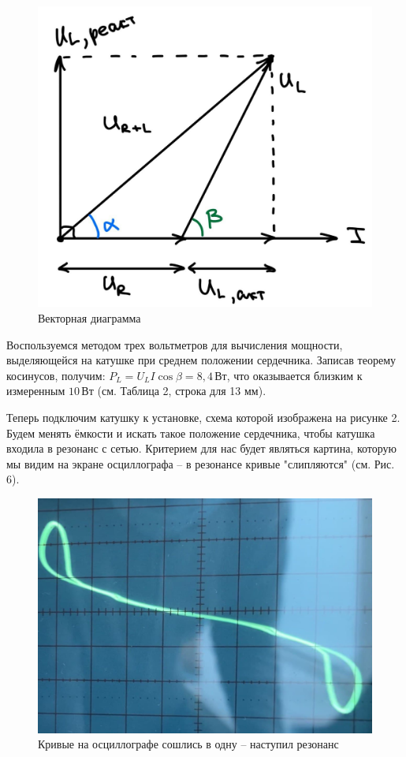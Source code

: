 \documentclass[a4paper, fontsize = 14pt]{article}
\begin{document}
\begin{figure}[hbt]
	\centering
	\includegraphics[scale=0.2]{lab48ris5.png}
	\caption{Векторная диаграмма}
\end{figure}

Воспользуемся методом трех вольтметров для вычисления мощности, выделяющейся на катушке при среднем положении сердечника. Записав теорему косинусов, получим: $P_L = U_L I \cos{\beta} = 8,4 \, Вт$, что оказывается близким к измеренным $10 \, Вт$ (см. Таблица 2, строка для 13 мм). 

\newpage

Теперь подключим катушку к установке, схема которой изображена на рисунке 2. Будем менять ёмкости и искать такое положение сердечника, чтобы катушка входила в резонанс с сетью. Критерием для нас будет являться картина, которую мы видим на экране осциллографа -- в резонансе кривые "слипляются" (см. Рис. 6).

\begin{figure}[hbt]
	\centering
	\includegraphics[scale=0.3]{lab48ris6.png}
	\caption{Кривые на осциллографе сошлись в одну -- наступил резонанс}
\end{figure}
\end{document}
